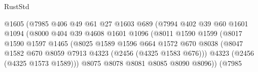 \begin{lexlean}{RustStd}
\begin{coremodule}
                                      @1605
                                      (@7985
                                        @406
                                        @49
                                        @61
                                        @27
                                        @1603
                                        @689
                                        (@7994
                                          @402
                                          @39
                                          @60
                                          @1601
                                          @1094
                                          (@8000
                                            @404
                                            @39
                                            @4608
                                            @1601
                                            @1096
                                            (@8011
                                              @1590
                                              @1599
                                              (@8017
                                                @1590
                                                @1597
                                                @1465
                                                (@8025
                                                  @1589
                                                  @1596
                                                  @664
                                                  @1572
                                                  @670
                                                  @8038
                                                  (@8047
                                                    @1582
                                                    @670
                                                    @8059
                                                    @7913
                                                    @4323
                                                    (@2456 (@4325 @1583 @676)))
                                                  @4323
                                                  (@2456 (@4325 @1573 @1589)))
                                                @8075
                                                @8078
                                                @8081
                                                @8085
                                                @8090
                                                @8096))
                                            (@7985

\end{coremodule}
\end{lexlean}

